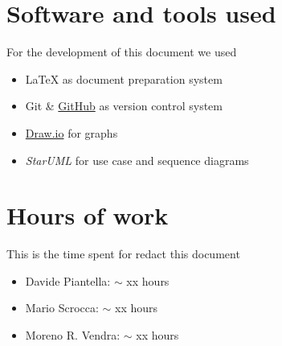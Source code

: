 \begin{appendices}
	\section{Software and tools used}
	For the development of this document we used
	\begin{itemize}
		\item \LaTeX{} as document preparation system
		\item Git \& \href{http://github.com}{GitHub} as version control system
		\item \href{http://draw.io}{Draw.io} for graphs
		\item \emph{StarUML} for use case and sequence diagrams
	\end{itemize}
	
	\section{Hours of work}
	This is the time spent for redact this document
	\begin{itemize}
		\item Davide Piantella: $\sim$ xx hours
		\item Mario Scrocca: $\sim$ xx hours
		\item Moreno R. Vendra: $\sim$ xx hours
	\end{itemize}
\end{appendices}